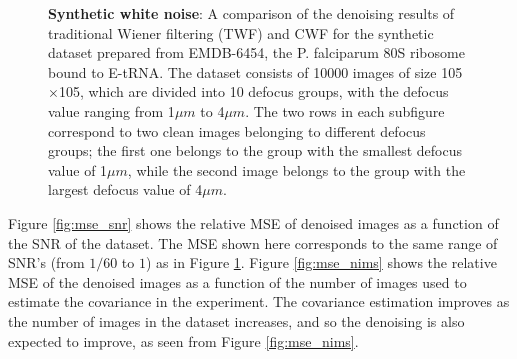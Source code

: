 \documentclass[review]{elsarticle}
\begin{document}
\begin{figure}[]
\centering
{}
\vspace{-1mm}
\vspace{-1mm}
\vspace{-3mm}
\caption{\textbf{Synthetic white noise}: A comparison of the denoising results of 
traditional Wiener filtering (TWF) and CWF for the 
synthetic dataset prepared from EMDB-6454, the P. falciparum 80S ribosome bound 
to E-tRNA. The dataset consists of 10000 images
of size 105$\times$105, which are divided into 10 defocus groups, with the 
defocus value ranging from 1$\mu m$ to 4$\mu m$. The two rows in each subfigure 
correspond to two clean
images belonging to different defocus groups;
the first one
belongs to the group with the smallest defocus value of 1$\mu m$, 
while the second image belongs to the group with the
largest defocus value of 4$\mu m$.  
}
\label{fig:ims_6454}
\end{figure}

Figure \ref{fig:mse_snr} shows the relative MSE of denoised images as a function
of the SNR of the dataset. The MSE shown here
corresponds to the same range of SNR's (from $1/60$ to $1$) as in Figure 
\ref{fig:ims_6454}. Figure \ref{fig:mse_nims} shows the relative MSE of the 
denoised images as a 
function of the number of images used to estimate the covariance in the experiment.
The covariance estimation improves as the number of images in the 
dataset increases, and so the denoising is also expected
to improve, as seen from Figure \ref{fig:mse_nims}.
\end{document}
